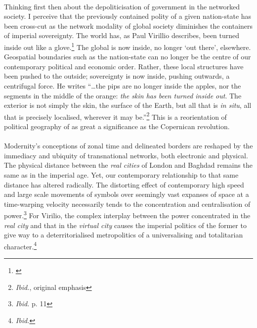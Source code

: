 \paragraph{}Thinking first then about the depoliticisation of government in the networked society. I perceive that the previously contained polity of a given nation-state has been cross-cut as the network modality of global society diminishes the containers of imperial sovereignty. The world has, as Paul Virillio describes, been turned inside out like a glove.\footnote{\cite[p. 10]{Virilio:2005jl}} The global is now inside, no longer `out there', elsewhere. Geospatial boundaries such as the nation-state can no longer be the centre of our contemporary political and economic order. Rather, these local structures have been pushed to the outside; sovereignty is now inside, pushing outwards, a centrifugal force.  He writes ``\ldots the pips are no longer inside the apples, nor the segments in the middle of the orange: \textit{the skin has been turned inside out}. The exterior is not simply the skin, the surface of the Earth, but all that is \textit{in situ}, all that is precisely localised, wherever it may be.''\footnote{\textit{Ibid.}, original emphasis} This is a reorientation of political geography of as great a significance as the Copernican revolution.

\paragraph{}Modernity's conceptions of zonal time and delineated borders are reshaped by the immediacy and ubiquity of transnational  networks, both electronic and physical. The physical distance between the \textit{real cities} of London and Baghdad remains the same as in the imperial age. Yet, our contemporary relationship to that same distance has altered radically. The distorting effect of contemporary high speed and large scale movements of symbols over seemingly vast expanses of space at a time-warping velocity necessarily tends to the concentration and centralisation of power.\footnote{\textit{Ibid.} p. 11}  For Virilio, the complex interplay between the power concentrated in the \textit{real city} and that in the \textit{virtual city} causes the imperial politics of the former to give way to a deterritorialised metropolitics of a universalising and totalitarian character.\footnote{\textit{Ibid.}}

